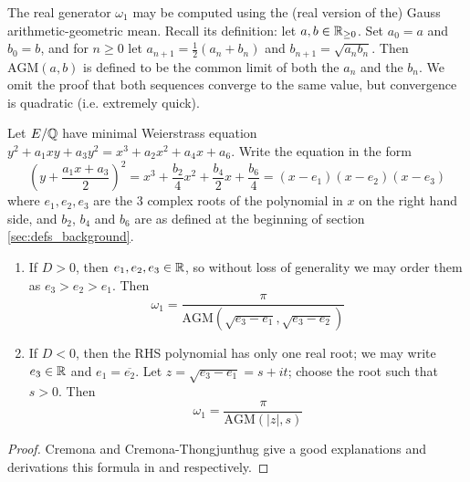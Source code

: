 \documentclass[10pt]{article}
\newcommand{\AGM}{\text{AGM}}
\newcommand{\conj}[1]{\overline{#1}}
\begin{document}
The real generator $\omega_1$ may be computed using the (real version of the) Gauss arithmetic-geometric mean. Recall its definition: let $a,b \in \mathbb{R}_{\ge0}$. Set $a_0 = a$ and $b_0 = b$, and for $n\ge 0$ let $a_{n+1} = \frac{1}{2}(a_{n}+b_{n})$ and $b_{n+1} = \sqrt{a_{n}b_{n}}$. Then $\AGM(a,b)$ is defined to be the common limit of both the $a_n$ and the $b_n$. We omit the proof that both sequences converge to the same value, but convergence is quadratic (i.e. extremely quick).

\begin{proposition}
Let $E/\mathbb{Q}$ have minimal Weierstrass equation $y^2 + a_1 xy + a_3 y^2 = x^3 + a_2 x^2 + a_4 x + a_6$. Write the equation in the form
\begin{equation*}
\left(y + \frac{a_1x + a_3}{2}\right)^2 = x^3 + \frac{b_2}{4} x^2 + \frac{b_4}{2} x + \frac{b_6}{4} = (x-e_1)(x-e_2)(x-e_3)
\end{equation*}
where $e_1,e_2,e_3$ are the 3 complex roots of the polynomial in $x$ on the right hand side, and $b_2$, $b_4$ and $b_6$ are as defined at the beginning of section \ref{sec:defs_background}.
\begin{enumerate}
\item If $D > 0$, then $e_1,e_2,e_3 \in \mathbb{R}$, so without loss of generality we may order them as $e_3 > e_2 > e_1$. Then
\begin{equation}
\omega_1 = \frac{\pi}{\AGM(\sqrt{e_3-e_1},\sqrt{e_3-e_2})}
\end{equation}
\item If $D < 0$, then the RHS polynomial has only one real root; we may write $e_3 \in \mathbb{R}$ and $e_1 = \conj{e_2}$. Let $z = \sqrt{e_3-e_1} = s + it$; choose the root such that $s>0$. Then
\begin{equation}
\omega_1 = \frac{\pi}{\AGM(|z|,s)}
\end{equation}
\end{enumerate}
\end{proposition}
\begin{proof}
Cremona and Cremona-Thongjunthug give a good explanations and derivations this formula in \cite{Cre-1997} and \cite{Cre-2013} respectively.
\end{proof}
\end{document}
